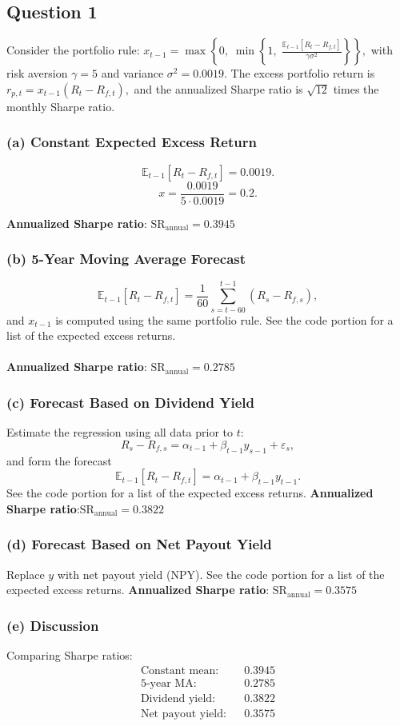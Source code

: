 \subsection*{Question 1}

Consider the portfolio rule:
$
x_{t-1} = \max\left\{0,\; \min\left\{1,\; 
\frac{\mathbb{E}_{t-1}[R_t - R_{f,t}]}{\gamma\sigma^2} \right\}\right\},
$
with risk aversion $\gamma = 5$ and variance $\sigma^2 = 0.0019$.  
The excess portfolio return is
$
r_{p,t} = x_{t-1}(R_t - R_{f,t}),
$
and the annualized Sharpe ratio is $\sqrt{12}$ times the monthly Sharpe ratio.
\subsubsection*{(a) Constant Expected Excess Return}
$$
\mathbb{E}_{t-1}[R_t - R_{f,t}] = 0.0019.
$$
$$
x = \frac{0.0019}{5 \cdot 0.0019} = 0.2.
$$

\textbf{Annualized Sharpe ratio}: $\boxed{\text{SR}_{\text{annual}} = 0.3945}$
\subsubsection*{(b) 5-Year Moving Average Forecast}
$$
\mathbb{E}_{t-1}[R_t - R_{f,t}] = \frac{1}{60}\sum_{s=t-60}^{t-1} (R_s - R_{f,s}),
$$
and $x_{t-1}$ is computed using the same portfolio rule. See the code portion for a list of the expected excess returns.
\\\\
\textbf{Annualized Sharpe ratio}: $\boxed{\text{SR}_{\text{annual}} = 0.2785}$
\subsubsection*{(c) Forecast Based on Dividend Yield}
Estimate the regression using all data prior to $t$:
\[
R_s - R_{f,s} = \alpha_{t-1} + \beta_{t-1} y_{s-1} + \varepsilon_s,
\]
and form the forecast
\[
\mathbb{E}_{t-1}[R_t - R_{f,t}] 
= \alpha_{t-1} + \beta_{t-1} y_{t-1}.
\]
See the code portion for a list of the expected excess returns.
\textbf{Annualized Sharpe ratio}:$\boxed{\text{SR}_{\text{annual}} = 0.3822}$
\subsubsection*{(d) Forecast Based on Net Payout Yield}
Replace $y$ with net payout yield (NPY).
See the code portion for a list of the expected excess returns.
\textbf{Annualized Sharpe ratio}: $\boxed{\text{SR}_{\text{annual}} = 0.3575}$
\subsubsection*{(e) Discussion}
Comparing Sharpe ratios:
\[
\begin{aligned}
\text{Constant mean:} && 0.3945 \\
\text{5-year MA:} && 0.2785 \\
\text{Dividend yield:} && 0.3822 \\
\text{Net payout yield:} && 0.3575
\end{aligned}
\]

